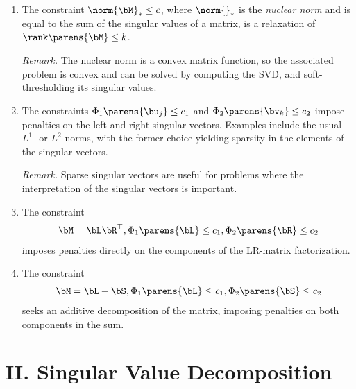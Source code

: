 \documentclass[12pt]{article}
\begin{document}
\begin{enumerate}[label=\textbf{\arabic*.}]
\begin{enumerate}
		\item The constraint $\norm{\bM}_* \le c$, where $\norm{}_*$ is the \emph{nuclear norm} and is equal to the sum of the singular values of a matrix, is a relaxation of $\rank \parens{\bM} \le k$. 
		
		\textit{Remark.} The nuclear norm is a convex matrix function, so the associated problem is convex and can be solved by computing the SVD, and soft-thresholding its singular values. 
		
		\item The constraints $\Phi_1 \parens{\bu_j} \le c_1$ and $\Phi_2 \parens{\bv_k} \le c_2$ impose penalties on the left and right singular vectors. Examples include the usual $L^1$- or $L^2$-norms, with the former choice yielding sparsity in the elements of the singular vectors. 
		
		\textit{Remark.} Sparse singular vectors are useful for problems where the interpretation of the singular vectors is important. 
		
		\item The constraint 
		\begin{align*}
			\bM = \bL \bR^\top, \Phi_1 \parens{\bL} \le c_1, \Phi_2 \parens{\bR} \le c_2
		\end{align*}
		imposes penalties directly on the components of the LR-matrix factorization. 

		\item The constraint 
		\begin{align*}
			\bM = \bL + \bS, \Phi_1 \parens{\bL} \le c_1, \Phi_2 \parens{\bS} \le c_2 
		\end{align*}
		seeks an additive decomposition of the matrix, imposing penalties on both components in the sum. 
		
	\end{enumerate}

\end{enumerate}


\section*{II. Singular Value Decomposition}
\end{document}

